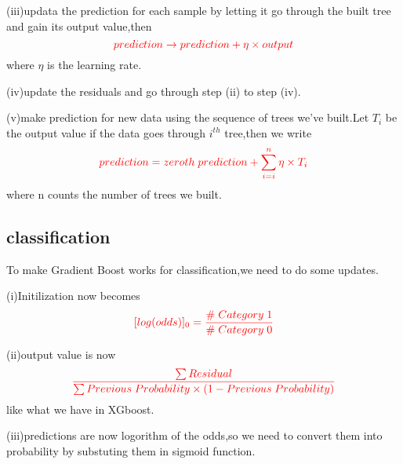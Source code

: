 \documentclass{article}
\begin{document}
(iii)updata the prediction for each sample by letting it go through the built tree and gain its output value,then$$\textcolor{red}{prediction\rightarrow prediction+\eta\times output}$$where $\eta$ is the learning rate.

(iv)update the residuals and go through step (ii) to step (iv).

(v)make prediction for new data using the sequence of trees we've built.Let $T_i$ be the output value if the data goes through $i^{th}$ tree,then we write$$\textcolor{red}{prediction=zeroth\;prediction+\sum_{i=i}^{n}\eta\times T_i}$$where n counts the number of trees we built.
\subsection{classification}
To make Gradient Boost works for classification,we need to do some updates.

(i)Initilization now becomes $$\textcolor{red}{[log(odds)]_0=\frac{\#\;Category\;1}{\#\;Category\;0}}$$

(ii)output value is now $$\textcolor{red}{\frac{\sum Residual}{\sum Previous\;Probability\times(1-Previous\;Probability)}}$$like what we have in XGboost.

(iii)predictions are now logorithm of the odds,so we need to convert them into probability by substuting them in sigmoid function.
\end{document}
